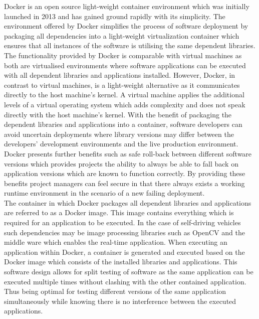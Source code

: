 Docker is an open source light-weight container environment which was initially launched in 2013 and has gained ground rapidly with its simplicity. The environment offered by Docker simplifies the process of software deployment by packaging all dependencies into a light-weight virtualization container which ensures that all instances of the software is utilising the same dependent libraries. The functionality provided by Docker is comparable with virtual machines as both are virtualised environments where software applications can be executed with all dependent libraries and applications installed. However, Docker, in contrast to virtual machines, is a light-weight alternative as it communicates directly to the host machine's kernel. A virtual machine applies the additional levels of a virtual operating system which adds complexity and does not speak directly with the host machine's kernel. With the benefit of packaging the dependent libraries and applications into a container, software developers can avoid uncertain deployments where library versions may differ between the developers' development environments and the live production environment. Docker presents further benefits such as safe roll-back between different software versions which provides projects the ability to always be able to fall back on application versions which are known to function correctly. By providing these benefits project managers can feel secure in that there always exists a working runtime environment in the scenario of a new failing deployment.\\

The container in which Docker packages all dependent libraries and applications are referred to as a Docker image. This image contains everything which is required for an application to be executed. In the case of self-driving vehicles such dependencies may be image processing libraries such as OpenCV and the middle ware which enables the real-time application. When executing an application within Docker, a container is generated and executed based on the Docker image which consists of the installed libraries and applications. This software design allows for split testing of software as the same application can be executed multiple times without clashing with the other contained application. Thus being optimal for testing different versions of the same application simultaneously while knowing there is no interference between the executed applications.

